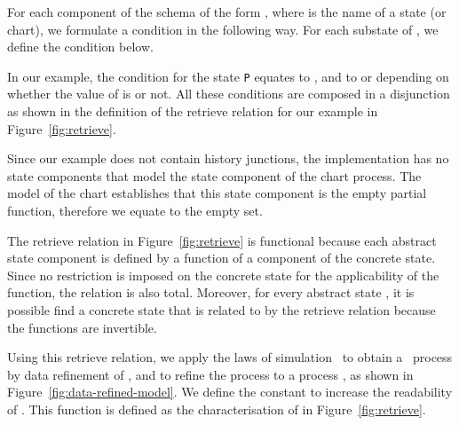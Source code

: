 \documentclass[submission]{eptcs}
\begin{document}
For each component of the schema  of the form , where  is the name of a state (or chart), we formulate a condition in the following way. For each substate  of , we define the condition below.

In our example, the condition for the state \texttt{P} equates  to , and  to  or  depending on whether the value of  is  or not. All these conditions are composed in a disjunction as shown in the definition of the retrieve relation for our example in Figure~\ref{fig:retrieve}.



Since our example does not contain history junctions, the implementation has no state components that model the state component  of the chart process. The model of the chart establishes that this state component is the empty partial function, therefore we equate  to the empty set.

The retrieve relation in Figure~\ref{fig:retrieve} is functional because each abstract state component is defined by a function of a component of the concrete state. Since no restriction is imposed on the concrete state for the applicability of the function, the relation is also total. Moreover, for every abstract state , it is possible find a concrete state that is related to  by the retrieve relation because the functions are invertible.





Using this retrieve relation, we apply the laws of simulation~\cite{Cavalcanti2003a,Oliveira2006a} to obtain a \Circus\ process  by data refinement of , and to refine the process  to a process , as shown in Figure~\ref{fig:data-refined-model}. We  define the constant  to increase the readability of . This function is defined as the characterisation of  in Figure~\ref{fig:retrieve}.
\end{document}

